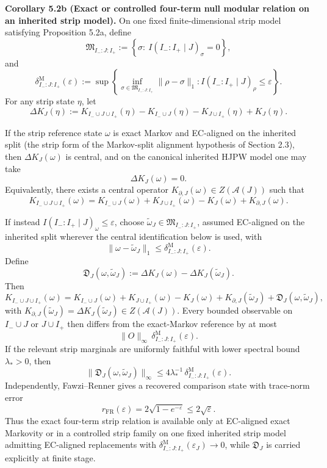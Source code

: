 \textbf{Corollary 5.2b (Exact or controlled four-term null modular relation on an inherited strip model).} On one fixed finite-dimensional strip model satisfying Proposition 5.2a, define
\[
\mathfrak M_{I_-:J:I_+}
:=
\left\{
\sigma:\ I(I_-:I_+\mid J)_\sigma=0
\right\},
\]
and
\[
\delta^{\mathrm M}_{I_-:J:I_+}(\varepsilon)
:=
\sup\left\{
\inf_{\sigma\in\mathfrak M_{I_-:J:I_+}}\|\rho-\sigma\|_1:
I(I_-:I_+\mid J)_\rho\le\varepsilon
\right\}.
\]
For any strip state \(\eta\), let
\[
\Delta K_J(\eta)
:=
K_{I_-\cup J\cup I_+}(\eta)-K_{I_-\cup J}(\eta)-K_{J\cup I_+}(\eta)+K_J(\eta).
\]

If the strip reference state \(\omega\) is exact Markov and EC-aligned on the inherited split (the strip form of the Markov-split alignment hypothesis of Section 2.3), then \(\Delta K_J(\omega)\) is central, and on the canonical inherited HJPW model one may take
\[
\Delta K_J(\omega)=0.
\]
Equivalently, there exists a central operator \(K_{\partial,J}(\omega)\in Z(\mathcal A(J))\) such that
\[
K_{I_-\cup J\cup I_+}(\omega)
=
K_{I_-\cup J}(\omega)+K_{J\cup I_+}(\omega)-K_J(\omega)+K_{\partial,J}(\omega).
\]

If instead \(I(I_-:I_+\mid J)_\omega\le\varepsilon\), choose \(\widetilde\omega_J\in\mathfrak M_{I_-:J:I_+}\), assumed EC-aligned on the inherited split wherever the central identification below is used, with
\[
\|\omega-\widetilde\omega_J\|_1
\le
\delta^{\mathrm M}_{I_-:J:I_+}(\varepsilon).
\]
Define
\[
\mathfrak D_J(\omega,\widetilde\omega_J)
:=
\Delta K_J(\omega)-\Delta K_J(\widetilde\omega_J).
\]
Then
\[
K_{I_-\cup J\cup I_+}(\omega)
=
K_{I_-\cup J}(\omega)+K_{J\cup I_+}(\omega)-K_J(\omega)
+K_{\partial,J}(\widetilde\omega_J)
+\mathfrak D_J(\omega,\widetilde\omega_J),
\]
with \(K_{\partial,J}(\widetilde\omega_J)=\Delta K_J(\widetilde\omega_J)\in Z(\mathcal A(J))\). Every bounded observable on \(I_-\cup J\) or \(J\cup I_+\) then differs from the exact-Markov reference by at most
\[
\|O\|_\infty\,\delta^{\mathrm M}_{I_-:J:I_+}(\varepsilon).
\]
If the relevant strip marginals are uniformly faithful with lower spectral bound \(\lambda_\ast>0\), then
\[
\|\mathfrak D_J(\omega,\widetilde\omega_J)\|_\infty
\le
4\lambda_\ast^{-1}\,\delta^{\mathrm M}_{I_-:J:I_+}(\varepsilon).
\]
Independently, Fawzi--Renner gives a recovered comparison state with trace-norm error
\[
r_{\mathrm{FR}}(\varepsilon)=2\sqrt{1-e^{-\varepsilon}}\le 2\sqrt{\varepsilon}.
\]
Thus the exact four-term strip relation is available only at EC-aligned exact Markovity or in a controlled strip family on one fixed inherited strip model admitting EC-aligned replacements with \(\delta^{\mathrm M}_{I_-:J:I_+}(\varepsilon_J)\to0\), while \(\mathfrak D_J\) is carried explicitly at finite stage.

